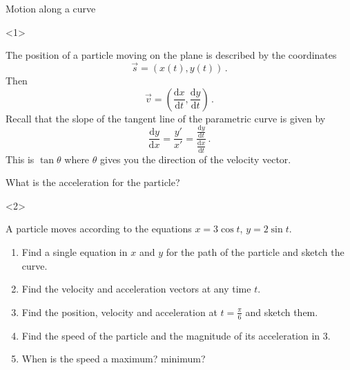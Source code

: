 \begin{frame}{Motion along a curve}

\begin{onlyenv}<1>


The position of a particle moving on the plane is described by the
coordinates
\[
\vec{s}=\left(x\left(t\right),y\left(t\right)\right)\,.
\]
Then
\[
\vec{v}=\left(\frac{\mathrm{d}x}{\mathrm{d}t},\frac{\mathrm{d}y}{\mathrm{d}t}\right)\,.
\]
Recall that the slope of the tangent line of the parametric curve
is given by
\[
\frac{\mathrm{d}y}{\mathrm{d}x}=\frac{y'}{x'}=\frac{\frac{\mathrm{d}y}{\mathrm{d}t}}{\frac{\mathrm{d}x}{\mathrm{d}t}}\,.
\]
This is $\tan\theta$ where $\theta$ gives you the direction of the
velocity vector.


\alert{What is the acceleration for the particle? }

\end{onlyenv}



\begin{onlyenv}<2>

\begin{example}
A particle moves according to the equations $x=3\cos t$, $y=2\sin t$.
\begin{enumerate}
\item Find a single equation in $x$ and $y$ for the path of the particle
and sketch the curve.
\item Find the velocity and acceleration vectors at any time $t$.
\item Find the position, velocity and acceleration at $t=\frac{\pi}{6}$
and sketch them.
\item Find the speed of the particle and the magnitude of its acceleration
in 3.
\item When is the speed a maximum? minimum?
\end{enumerate}

\end{example}

\end{onlyenv}

\end{frame}

